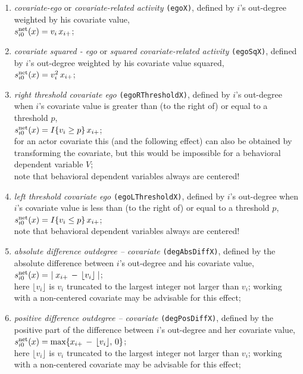 \documentclass[a4paper,fleqn,11pt]{article}
\newcommand{\+}{\, + \,}
\newcommand{\vit}{\theenumi}
\begin{document}
\begin{enumerate}
 \item {\em covariate-ego} or {\em covariate-related activity}
 \texttt{(egoX)},
 defined by $i$'s out-degree weighted by his covariate value,\\
 $s^{\rm net}_{i\vit}(x) = v_i \, x_{i+} $;

 \item {\em covariate squared - ego} or {\em squared covariate-related activity}
 \texttt{(egoSqX)},
 defined by $i$'s out-degree weighted by his covariate value squared,\\
 $s^{\rm net}_{i\vit}(x) = v_i^2 \, x_{i+} $;

 \item {\em right threshold covariate ego}
 \texttt{(egoRThresholdX)},
 defined by $i$'s out-degree when $i$'s covariate value
 is greater than (to the right of)  or equal to a threshold $p$,\\
 $s^{\rm net}_{i\vit}(x) = I\{v_i \geq p\} \, x_{i+} $;\\
 for an actor covariate this (and the following effect)
 can also be obtained by transforming
 the covariate, but this would be impossible for a behavioral dependent
 variable $V$;\\
 note that behavioral dependent variables always are centered!

 \item {\em left threshold covariate ego}
 \texttt{(egoLThresholdX)},
 defined by $i$'s out-degree when $i$'s covariate value
 is less than (to the right of) or equal to a threshold $p$,\\
 $s^{\rm net}_{i\vit}(x) = I\{v_i \leq p\} \, x_{i+} $;\\
 note that behavioral dependent variables always are centered!

 \item {\em absolute difference outdegree -- covariate}
 \texttt{(degAbsDiffX)},
 defined by the absolute difference between $i$'s out-degree and his covariate value,\\
 $s^{\rm net}_{i\vit}(x) = \ \mid x_{i+} \,-\, \lfloor v_i \rfloor \mid $;\\
 here $\lfloor v_i \rfloor $ is $v_i$ truncated to the largest integer
 not larger than $v_i$;
 working with a non-centered covariate may be advisable for this effect;

 \item {\em positive difference outdegree -- covariate}
 \texttt{(degPosDiffX)},
 defined by the positive part of the difference between $i$'s out-degree
 and her covariate value,\\
 $s^{\rm net}_{i\vit}(x) = \max \{ x_{i+} \,-\, \lfloor v_i \rfloor  ,\, 0 \} $;\\
 here $\lfloor v_i \rfloor $ is $v_i$ truncated to the largest integer
 not larger than $v_i$;
 working with a non-centered covariate may be advisable for this effect;


\end{enumerate}
\end{document}
